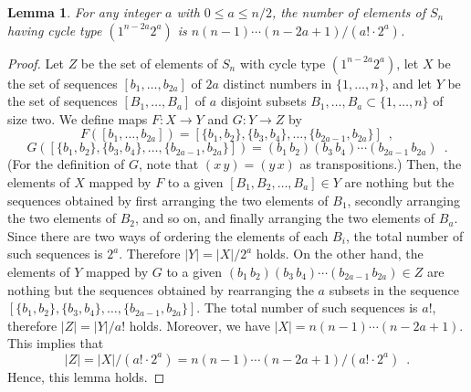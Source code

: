 \documentclass[11pt]{article}
\newtheorem{lemma}{Lemma}
\begin{document}
\begin{lemma}
\label{lem:number_of_permutation_with_type}
For any integer $a$ with $0 \leq a \leq n/2$, the number of elements of $S_n$ having cycle type $(1^{n-2a}2^a)$ is $n(n-1) \cdots (n-2a+1) / (a! \cdot 2^a)$.
\end{lemma}
\begin{proof}
Let $Z$ be the set of elements of $S_n$ with cycle type $(1^{n-2a}2^a)$, let $X$ be the set of sequences $[b_1,\dots,b_{2a}]$ of $2a$ distinct numbers in $\{1,\dots,n\}$, and let $Y$ be the set of sequences $[B_1,\dots,B_a]$ of $a$ disjoint subsets $B_1,\dots,B_a \subset \{1,\dots,n\}$ of size two.
We define maps $F \colon X \to Y$ and $G \colon Y \to Z$ by
\begin{displaymath}
F([b_1,\dots,b_{2a}]) = [\{b_1,b_2\},\{b_3,b_4\},\dots,\{b_{2a-1},b_{2a}\}] \enspace,
\end{displaymath}
\begin{displaymath}
G([\{b_1,b_2\},\{b_3,b_4\},\dots,\{b_{2a-1},b_{2a}\}]) = (b_1\,b_2)(b_3\,b_4) \cdots (b_{2a-1}\,b_{2a}) \enspace.
\end{displaymath}
(For the definition of $G$, note that $(x\,y) = (y\,x)$ as transpositions.)
Then, the elements of $X$ mapped by $F$ to a given $[B_1,B_2,\dots,B_a] \in Y$ are nothing but the sequences obtained by first arranging the two elements of $B_1$, secondly arranging the two elements of $B_2$, and so on, and finally arranging the two elements of $B_a$.
Since there are two ways of ordering the elements of each $B_i$, the total number of such sequences is $2^a$.
Therefore $|Y| = |X| / 2^a$ holds.
On the other hand, the elements of $Y$ mapped by $G$ to a given $(b_1\,b_2)(b_3\,b_4) \cdots (b_{2a-1}\,b_{2a}) \in Z$ are nothing but the sequences obtained by rearranging the $a$ subsets in the sequence $[\{b_1,b_2\},\{b_3,b_4\},\dots,\{b_{2a-1},b_{2a}\}]$.
The total number of such sequences is $a!$, therefore $|Z| = |Y| / a!$ holds.
Moreover, we have $|X| = n(n-1) \cdots (n-2a+1)$.
This implies that
\begin{displaymath}
|Z| = |X| / (a! \cdot 2^a) = n(n-1) \cdots (n-2a+1) / (a! \cdot 2^a) \enspace.
\end{displaymath}
Hence, this lemma holds.
\end{proof}
\end{document}
